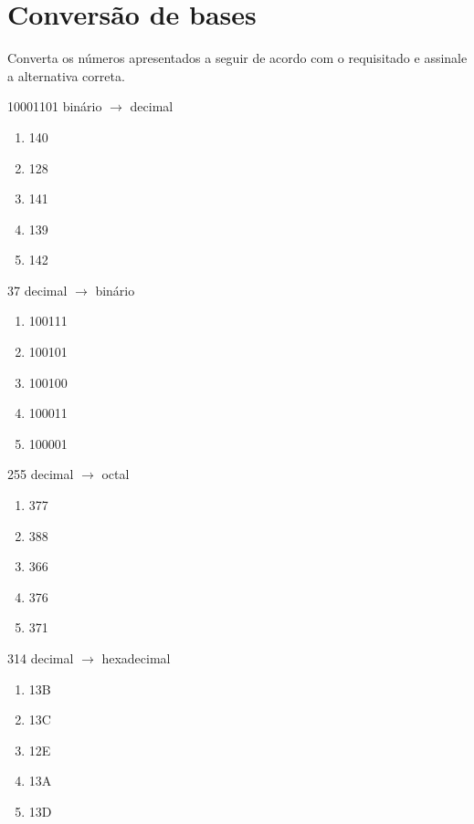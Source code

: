\section*{Conversão de bases} Converta os números apresentados a seguir de acordo com o
requisitado e assinale a alternativa correta.

\begin{minipage}{.45\textwidth}
\exercise \vfill
{\large 10001101} binário $\rightarrow$ decimal
\begin{enumerate}[\itemlabel]
\item 140
\item 128
\item 141 %
\item 139
\item 142
\end{enumerate}
\end{minipage}\hspace{.075\textwidth}
\begin{minipage}{.4\textwidth}
\exercise
{\large 37} decimal $\rightarrow$ binário
\begin{enumerate}[\itemlabel]
\item 100111
\item 100101 %
\item 100100
\item 100011
\item 100001
\end{enumerate}
\end{minipage}

\begin{minipage}{.45\textwidth}
\exercise \vfill
{\large 255} decimal $\rightarrow$ octal
\begin{enumerate}[\itemlabel]
\item 377 %
\item 388
\item 366
\item 376
\item 371
\end{enumerate}
\end{minipage}\hspace{.075\textwidth}
\begin{minipage}{.4\textwidth}

\exercise
{\large 314} decimal $\rightarrow$ hexadecimal
\begin{enumerate}[\itemlabel]
\item 13B
\item 13C
\item 12E
\item 13A %
\item 13D
\end{enumerate}
\end{minipage}

